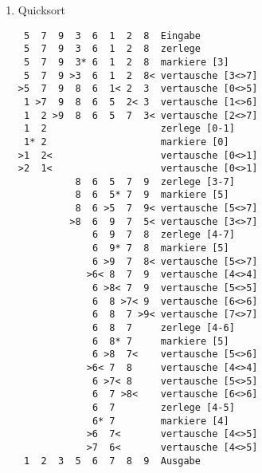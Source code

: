 \documentclass{bschlangaul-aufgabe}
\begin{document}
\begin{enumerate}

\item Quicksort

\begin{bAntwort}

\begin{verbatim}
 5  7  9  3  6  1  2  8  Eingabe
 5  7  9  3  6  1  2  8  zerlege
 5  7  9  3* 6  1  2  8  markiere [3]
 5  7  9 >3  6  1  2  8< vertausche [3<>7]
>5  7  9  8  6  1< 2  3  vertausche [0<>5]
 1 >7  9  8  6  5  2< 3  vertausche [1<>6]
 1  2 >9  8  6  5  7  3< vertausche [2<>7]
 1  2                    zerlege [0-1]
 1* 2                    markiere [0]
>1  2<                   vertausche [0<>1]
>2  1<                   vertausche [0<>1]
          8  6  5  7  9  zerlege [3-7]
          8  6  5* 7  9  markiere [5]
          8  6 >5  7  9< vertausche [5<>7]
         >8  6  9  7  5< vertausche [3<>7]
             6  9  7  8  zerlege [4-7]
             6  9* 7  8  markiere [5]
             6 >9  7  8< vertausche [5<>7]
            >6< 8  7  9  vertausche [4<>4]
             6 >8< 7  9  vertausche [5<>5]
             6  8 >7< 9  vertausche [6<>6]
             6  8  7 >9< vertausche [7<>7]
             6  8  7     zerlege [4-6]
             6  8* 7     markiere [5]
             6 >8  7<    vertausche [5<>6]
            >6< 7  8     vertausche [4<>4]
             6 >7< 8     vertausche [5<>5]
             6  7 >8<    vertausche [6<>6]
             6  7        zerlege [4-5]
             6* 7        markiere [4]
            >6  7<       vertausche [4<>5]
            >7  6<       vertausche [4<>5]
 1  2  3  5  6  7  8  9  Ausgabe
\end{verbatim}
\end{bAntwort}

\end{enumerate}
\end{document}
